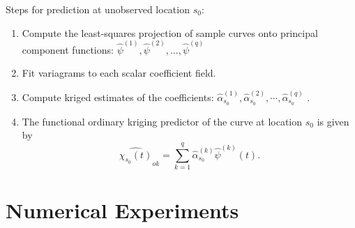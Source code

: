 Steps for prediction at unobserved location $s_0$: 
\begin{enumerate}
	\item Compute the least-squares projection of sample curves onto principal component functions: $\hat{\psi}^{(1)}, \hat{\psi}^{(2)}, \dots, \hat{\psi}^{(q)}$ 
	\item Fit variagrams to each scalar coefficient field.
	\item Compute kriged estimates of the coefficients: $\hat{\alpha}_{s_0}^{(1)}, \hat{\alpha}_{s_0}^{(2)}, \cdots, \hat{\alpha}_{s_0}^{(q)}$ .
	\item The functional ordinary kriging predictor of the curve at location $s_0$ is given by
	\begin{equation}
		\widehat{\chi_{s_0}(t)}_{ok} = \sum_{k=1}^{q} \hat{\alpha}_{s_0}^{(k)}\hat{\psi}^{(k)}(t).
	\end{equation} 
	
\end{enumerate}



\section{Numerical Experiments} 

\label{sec:numerical_experiments}

